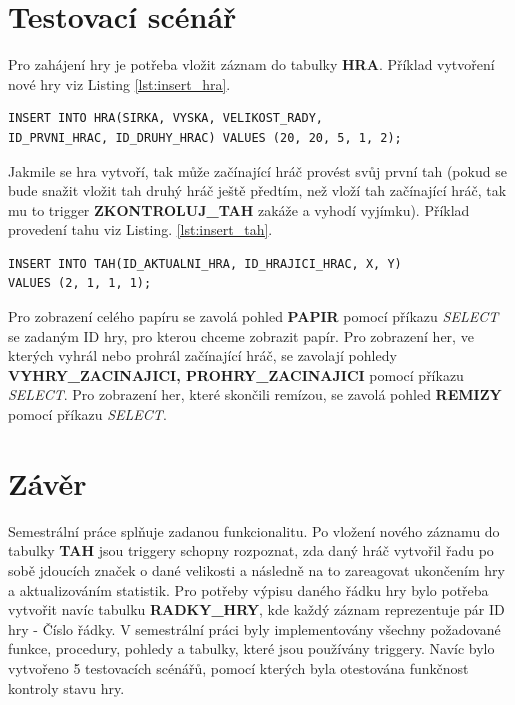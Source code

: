 \documentclass[12pt, a4paper]{article}
\begin{document}
\section{Testovací scénář}
Pro zahájení hry je potřeba vložit záznam do tabulky \textbf{HRA}. Příklad vytvoření nové hry viz Listing \ref{lst:insert_hra}.
		\begin{lstlisting}[caption = {Příklad vložení záznamu do tabulky \textbf{HRA}.}, label = {lst:insert_hra}, captionpos=b, frame=single]
INSERT INTO HRA(SIRKA, VYSKA, VELIKOST_RADY, 
ID_PRVNI_HRAC, ID_DRUHY_HRAC) VALUES (20, 20, 5, 1, 2);
		\end{lstlisting}

Jakmile se hra vytvoří, tak může začínající hráč provést svůj první tah (pokud se bude snažit vložit tah druhý hráč ještě předtím, než vloží tah začínající hráč, tak mu to trigger \textbf{ZKONTROLUJ\_TAH} zakáže a vyhodí vyjímku). Příklad provedení tahu viz Listing. \ref{lst:insert_tah}.
		\begin{lstlisting}[caption = {Příklad vložení záznamu do tabulky \textbf{TAH}.}, label = {lst:insert_tah}, captionpos=b, frame=single]
INSERT INTO TAH(ID_AKTUALNI_HRA, ID_HRAJICI_HRAC, X, Y) 
VALUES (2, 1, 1, 1);
		\end{lstlisting}

Pro zobrazení celého papíru se zavolá pohled \textbf{PAPIR} pomocí příkazu \textit{SELECT} se zadaným ID hry, pro kterou chceme zobrazit papír.
Pro zobrazení her, ve kterých vyhrál nebo prohrál začínající hráč, se zavolají pohledy \textbf{VYHRY\_ZACINAJICI, PROHRY\_ZACINAJICI} pomocí příkazu \textit{SELECT}.
Pro zobrazení her, které skončili remízou, se zavolá pohled \textbf{REMIZY} pomocí příkazu \textit{SELECT}.


\section{Závěr}
Semestrální práce splňuje zadanou funkcionalitu. Po vložení nového záznamu do tabulky \textbf{TAH} jsou triggery schopny rozpoznat, zda daný hráč vytvořil řadu po sobě jdoucích značek o dané velikosti a následně na to zareagovat ukončením hry a aktualizováním statistik. Pro potřeby výpisu daného řádku hry bylo potřeba vytvořit navíc tabulku \textbf{RADKY\_HRY}, kde každý záznam reprezentuje pár ID hry - Číslo řádky. V semestrální práci byly implementovány všechny požadované funkce, procedury, pohledy a tabulky, které jsou používány triggery. Navíc bylo vytvořeno 5 testovacích scénářů, pomocí kterých byla otestována funkčnost kontroly stavu hry.
	
\end{document}
